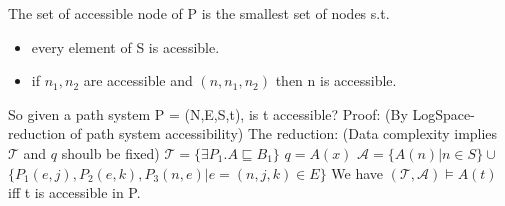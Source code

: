 \documentclass[11pt]{article}
\begin{document}
\begin{enumerate}
\begin{enumerate}
The set of accessible node of P is the smallest set of nodes s.t.
\begin{itemize}
\item every element of S is acessible.
\item if $n_{1}, n_{2}$ are accessible and $(n,n_{1}, n_{2})$ then n 
is accessible.\\
\end{itemize}
So given a path system P = (N,E,S,t), is t accessible?
Proof: (By LogSpace-reduction of path system accessibility)
The reduction:
(Data complexity implies $\mathcal{T}$ and $q$ shoulb be fixed)
$\mathcal{T} = \{\exists P_{1}. A \sqsubseteq B_{1}\}$
$q = A(x)$
$\mathcal{A} = \{ A(n)| n \in S\} \cup$ \\
      $\{P_{1}(e,j), P_{2}(e,k), P_{3}(n,e) | e=(n,j,k) \in E\}$
We have $(\mathcal{T},\mathcal{A}) \models A(t)$ 
iff t is accessible in P.
\end{enumerate}
\end{enumerate}
\end{document}
